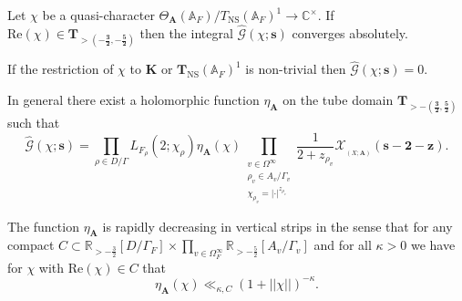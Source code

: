 \documentclass[10pt,a4paper]{amsart}
\DeclareMathOperator{\Eff}{\overline{Eff}}
\DeclareMathOperator{\NS}{NS}
\newcommand{\A}{\mathbb{A}}
\newcommand{\C}{\mathbb{C}}
\newcommand{\R}{\mathbb{R}}
\renewcommand{\Re}{\mathrm{Re}}
\begin{document}
\begin{lemma}\label{lem:Global Fourier transform}
	Let $\chi$ be a quasi-character $\Theta_{\mathbf{A}}(\A_F)/T_{\NS}(\A_F)^1 \to \C^{\times}$. If $\Re(\chi) \in \mathbf{T}_{> (\mathbf{-\frac{3}{2}}, \mathbf{-\frac{5}{2}})}$ then the integral $\hat{\mathcal{G}}(\chi ; \mathbf{s})$ converges absolutely.
	
	If the restriction of $\chi$ to $\mathbf{K}$ or $\mathbf{T}_{\NS}(\A_F)^1$ is non-trivial then $\hat{\mathcal{G}}(\chi ; \mathbf{s}) = 0$.
	
	In general there exist a holomorphic function $\eta_{\mathbf{A}}$ on the tube domain $\mathbf{T}_{> - (\mathbf{\frac{3}{2}}, \mathbf{\frac{5}{2}})}$ such that
	\begin{equation*}
		\hat{\mathcal{G}}(\chi ; \mathbf{s}) = \prod_{\rho \in D / \Gamma} L_{F_\rho}(2; \chi_{\rho}) \eta_{\mathbf{A}}(\chi) \prod_{\substack{v \in \Omega^{\infty} \\ \rho_v \in A_v / \Gamma_v \\ \chi_{\rho_v} = |\cdot|^{z_{\rho_v}}}} \frac{1}{2 + z_{\rho_v}} \mathcal{X}_{\Eff_{(X; \mathbf{A})}}(\mathbf{s} - \mathbf{2} - \bm{z}).
	\end{equation*}
	
	The function $\eta_{\mathbf{A}}$ is rapidly decreasing in vertical strips in the sense that for any compact $C \subset \R_{> -\frac{3}{2}}[D / \Gamma_F] \times \prod_{v \in \Omega_{F}^{\infty}} \R_{> -\frac{5}{2}}[A_v / \Gamma_v]$ and for all $\kappa > 0$ we have for $\chi$ with $\Re(\chi) \in C$ that
	\begin{equation}\label{eq:Rapid decay of eta}
		\eta_{\mathbf{A}}(\chi) \ll_{\kappa, C} (1 + ||\chi||)^{- \kappa}.
	\end{equation}
\end{lemma}
\end{document}
